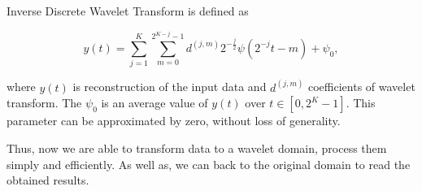 \begin{defn}
Inverse Discrete Wavelet Transform is defined as

\begin{equation}
y(t) = \sum_{j=1}^{K} \sum_{m=0}^{2^{K-j}-1} d^{(j,m)} 2^{-\frac{j}{2}} \psi\left(2^{-j}t - m\right) + \psi_0,
\end{equation}

where $y(t)$ is reconstruction of the input data and $d^{(j,m)}$ coefficients of wavelet transform. The $\psi_0$ is an average value of $y(t)$ over $t \in [0, 2^K-1]$. This parameter can be approximated by zero, without loss of generality.
\end{defn}

Thus, now we are able to transform data to a wavelet domain, process them simply and efficiently. As well as, we can back to the original domain to read the obtained results.
